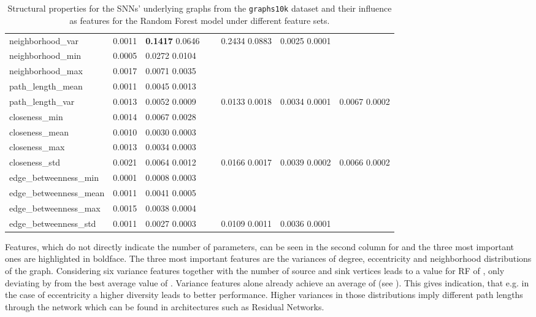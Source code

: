 \documentclass[runningheads]{llncs}
\begin{document}
\begin{landscape}
\begin{table}[htb]
\begin{tabular}{|l|l|l|l|l|l|l|}
	neighborhood\_var & 0.0011 & \textbf{0.1417} 0.0646 & ~ & 0.2434 0.0883 & 0.0025 0.0001 & ~ \\
	neighborhood\_min & 0.0005 & 0.0272 0.0104 & ~ & ~ & ~ & ~ \\
	neighborhood\_max & 0.0017 & 0.0071 0.0035 & ~ & ~ & ~ & ~ \\
	path\_length\_mean & 0.0011 & 0.0045 0.0013 & ~ & ~ & ~ & ~ \\
	path\_length\_var & 0.0013 & 0.0052 0.0009 & ~ & 0.0133 0.0018 & 0.0034 0.0001 & 0.0067 0.0002 \\
	closeness\_min & 0.0014 & 0.0067 0.0028 & ~ & ~ & ~ & ~ \\
	closeness\_mean & 0.0010 & 0.0030 0.0003 & ~ & ~ & ~ & ~ \\
	closeness\_max & 0.0013 & 0.0034 0.0003 & ~ & ~ & ~ & ~ \\
	closeness\_std & 0.0021 & 0.0064 0.0012 & ~ & 0.0166 0.0017 & 0.0039 0.0002 & 0.0066 0.0002 \\
	edge\_betweenness\_min & 0.0001 & 0.0008 0.0003 & ~ & ~ & ~ & ~ \\
	edge\_betweenness\_mean & 0.0011 & 0.0041 0.0005 & ~ & ~ & ~ & ~ \\
	edge\_betweenness\_max & 0.0015 & 0.0038 0.0004 & ~ & ~ & ~ & ~ \\
	edge\_betweenness\_std & 0.0011 & 0.0027 0.0003 & ~ & 0.0109 0.0011 & 0.0036 0.0001 & ~ \\
	\hline
\end{tabular}

	\caption{Structural properties for the SNNs' underlying graphs from the \texttt{graphs10k} dataset and their influence as features for the Random Forest model under different feature sets.}
	\label{tbl:structural-properties}
\end{table}
\end{landscape}

Features, which do not directly indicate the number of parameters, can be seen in the second column for  and the three most important ones are highlighted in boldface.
The three most important features are the variances of degree, eccentricity and neighborhood distributions of the graph.
Considering six variance features together with the number of source and sink vertices leads to a  value for RF of , only deviating by  from the best average  value of .
Variance features alone already achieve an average  of  (see ).
This gives indication, that e.g. in the case of eccentricity a higher diversity leads to better performance.
Higher variances in those distributions imply different path lengths through the network which can be found in architectures such as Residual Networks.
\end{document}
